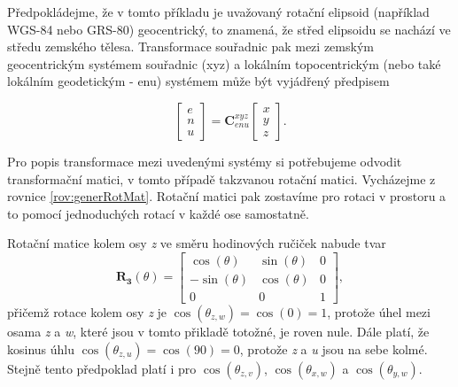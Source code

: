 \documentclass[11pt,a4paper]{article}
\begin{document}
Předpokládejme, že v tomto příkladu je uvažovaný rotační elipsoid (například WGS-84 nebo GRS-80) geocentrický, to znamená, že střed elipsoidu se nachází ve středu zemského tělesa. Transformace souřadnic pak mezi zemským geocentrickým systémem souřadnic (xyz) a lokálním topocentrickým (nebo také lokálním geodetickým - enu) systémem může být vyjádřený předpisem \cite{Soler1998}

\begin{equation}
\begin{bmatrix}
e \\
n \\
u
\end{bmatrix} = 
\mathbf{C}_{enu}^{xyz}
\begin{bmatrix}
x \\
y \\
z
\end{bmatrix}.
\label{rov:ecef2enu1}
\end{equation}

Pro popis transformace mezi uvedenými systémy si potřebujeme odvodit transformační matici, v tomto případě takzvanou rotační matici. Vycházejme z rovnice \ref{rov:generRotMat}. Rotační matici pak zostavíme pro rotaci v prostoru a to pomocí jednoduchých rotací v každé ose samostatně.

Rotační matice kolem osy \textit{z} ve směru hodinových ručiček nabude tvar
\begin{equation}
\mathbf{R_{3}}\left(\theta\right) = 
\begin{bmatrix}
\cos{\left(\theta\right)} & \sin{\left(\theta\right)} & 0 \\
-\sin{\left(\theta\right)} & \cos{\left(\theta\right)} & 0 \\
0 & 0 & 1
\end{bmatrix},
\end{equation}
přičemž rotace kolem osy \textit{z} je $\cos{\left(\theta_{z, w} \right)} = \cos{\left(0\right)} = 1$, protože úhel mezi osama \textit{z} a \textit{w}, které jsou v tomto přikladě totožné, je roven nule. Dále platí, že kosinus úhlu $ \cos{\left(\theta_{z, u} \right)}= \cos{\left(90\right)} = 0 $, protože \textit {z} a \textit {u} jsou na sebe kolmé. Stejně tento předpoklad platí i pro $\cos{\left(\theta_{z,v}\right)}$, $\cos{\left(\theta_{x,w}\right)}$ a $\cos{\left(\theta_{y,w}\right)}$.
\end{document}
